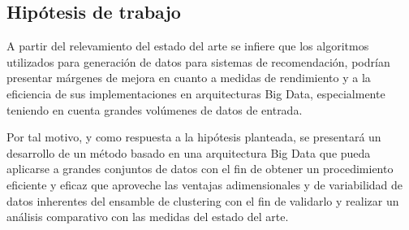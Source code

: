 \subsection{Hipótesis de trabajo}
A partir del relevamiento del estado del arte se infiere que los algoritmos utilizados para generación de datos para sistemas de recomendación, podrían presentar márgenes de mejora en cuanto a medidas de rendimiento y a la eficiencia de sus implementaciones en arquitecturas Big Data, especialmente teniendo en cuenta grandes volúmenes de datos de entrada.

\bigskip Por tal motivo, y como respuesta a la hipótesis planteada, se presentará un desarrollo de un método basado en una arquitectura Big Data que pueda aplicarse a grandes conjuntos de datos con el fin de obtener un procedimiento eficiente y eficaz que aproveche las ventajas adimensionales y de variabilidad de datos inherentes del ensamble de clustering con el fin de validarlo y realizar un análisis comparativo con las medidas del estado del arte.